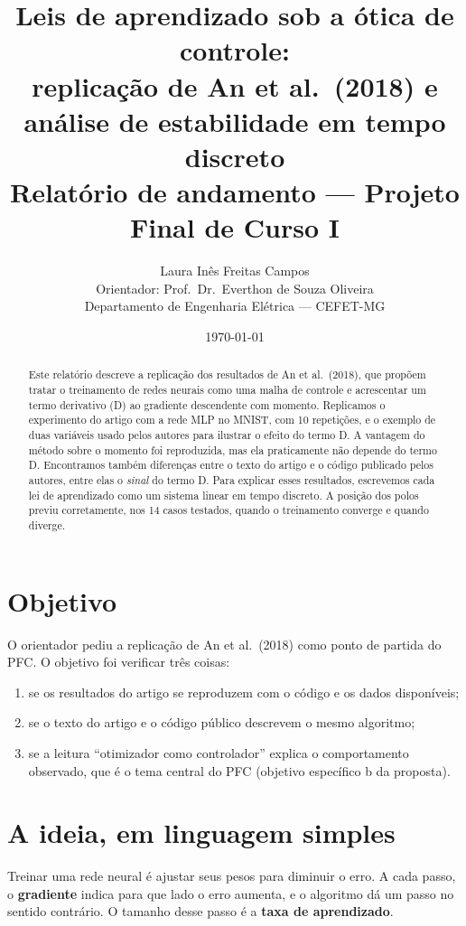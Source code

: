 \documentclass[11pt,a4paper]{article}
\title{\textbf{Leis de aprendizado sob a ótica de controle:\\
replicação de An et al.\ (2018) e análise de estabilidade em tempo discreto}\\[4pt]
\large Relatório de andamento --- Projeto Final de Curso I}
\author{Laura Inês Freitas Campos\\
\small Orientador: Prof.\ Dr.\ Everthon de Souza Oliveira\\
\small Departamento de Engenharia Elétrica --- CEFET-MG}
\date{\today}
\begin{document}
\maketitle

\begin{abstract}
\noindent
Este relatório descreve a replicação dos resultados de An et al.\ (2018), que
propõem tratar o treinamento de redes neurais como uma malha de controle e
acrescentar um termo derivativo (D) ao gradiente descendente com momento.
Replicamos o experimento do artigo com a rede MLP no MNIST, com 10 repetições, e o
exemplo de duas variáveis usado pelos autores para ilustrar o efeito do termo D.
A vantagem do método sobre o momento foi reproduzida, mas ela praticamente não
depende do termo D. Encontramos também diferenças entre o texto do artigo e o
código publicado pelos autores, entre elas o \emph{sinal} do termo D. Para explicar
esses resultados, escrevemos cada lei de aprendizado como um sistema linear em
tempo discreto. A posição dos polos previu corretamente, nos 14 casos testados,
quando o treinamento converge e quando diverge.
\end{abstract}

\section{Objetivo}

O orientador pediu a replicação de An et al.\ (2018) como ponto de partida do
PFC. O objetivo foi verificar três coisas:
\begin{enumerate}
  \item se os resultados do artigo se reproduzem com o código e os dados disponíveis;
  \item se o texto do artigo e o código público descrevem o mesmo algoritmo;
  \item se a leitura ``otimizador como controlador'' explica o comportamento
        observado, que é o tema central do PFC (objetivo específico b da proposta).
\end{enumerate}

\section{A ideia, em linguagem simples}

Treinar uma rede neural é ajustar seus pesos para diminuir o erro. A cada passo,
o \textbf{gradiente} indica para que lado o erro aumenta, e o algoritmo dá um passo
no sentido contrário. O tamanho desse passo é a \textbf{taxa de aprendizado}.
\end{document}
